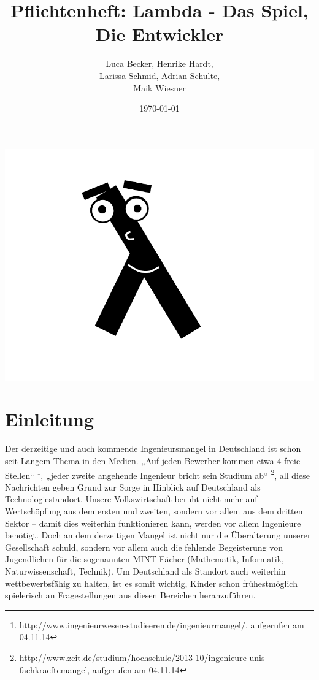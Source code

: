 \documentclass{scrartcl}
\begin{document}
\title{Pflichtenheft: Lambda - Das Spiel, \\ Die Entwickler}
\author{Luca Becker, Henrike Hardt,\\Larissa Schmid, Adrian Schulte,\\Maik Wiesner}
\date{\today}
\maketitle
\includegraphics[width=\textwidth]{assets/Lambdolino}
\thispagestyle{empty}

\clearpage

\thispagestyle{empty}
\tableofcontents
\thispagestyle{empty}

\clearpage
\setcounter{page}{1}




    


\section{Einleitung}

Der derzeitige und auch kommende Ingenieursmangel in Deutschland ist
schon seit Langem Thema in den Medien. „Auf jeden Bewerber kommen
etwa 4 freie Stellen“%
\footnote{http://www.ingenieurwesen-studieeren.de/ingenieurmangel/, aufgerufen am 04.11.14%
}, „jeder zweite angehende Ingenieur bricht sein Studium ab“%
\footnote{http://www.zeit.de/studium/hochschule/2013-10/ingenieure-unis-fachkraeftemangel, aufgerufen am 04.11.14%
}, all diese Nachrichten geben Grund zur Sorge in Hinblick auf Deutschland
als Technologiestandort. Unsere Volkswirtschaft beruht nicht mehr
auf Wertschöpfung aus dem ersten und zweiten, sondern vor allem aus
dem dritten Sektor – damit dies weiterhin funktionieren kann, werden
vor allem Ingenieure benötigt. Doch an dem derzeitigen Mangel ist
nicht nur die Überalterung unserer Gesellschaft schuld, sondern vor
allem auch die fehlende Begeisterung von Jugendlichen für die sogenannten
MINT-Fächer (Mathematik, Informatik, Naturwissenschaft, Technik).
Um Deutschland als Standort auch weiterhin wettbewerbsfähig zu halten,
ist es somit wichtig, Kinder schon frühestmöglich spielerisch an Fragestellungen
aus diesen Bereichen heranzuführen. 
\end{document}
